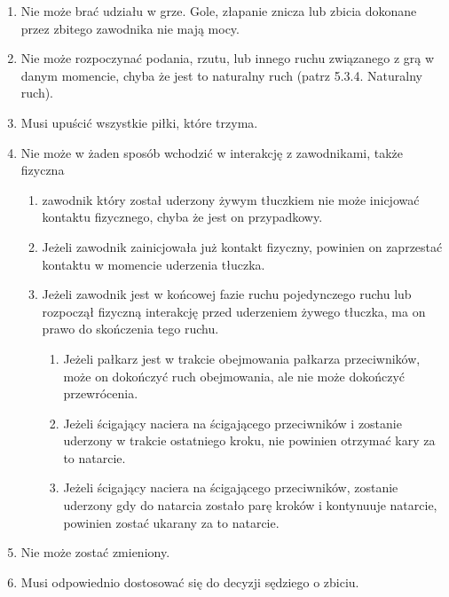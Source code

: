 \documentclass[12pt]{article}
\begin{document}
\begin{enumerate}
	\item
	      Nie może brać udziału w grze. Gole, złapanie znicza lub zbicia
	      dokonane przez zbitego zawodnika nie mają mocy.
	\item
	      Nie może rozpoczynać podania, rzutu, lub innego ruchu związanego z grą
	      w danym momencie, chyba że jest to naturalny ruch (patrz 5.3.4.
	      Naturalny ruch).
	\item
	      Musi upuścić wszystkie piłki, które trzyma.
	\item
	      Nie może w żaden sposób wchodzić w interakcję z zawodnikami, także
	      fizyczna

	      \begin{enumerate}
		      \item
		            zawodnik który został uderzony żywym tłuczkiem nie może inicjować
		            kontaktu fizycznego, chyba że jest on przypadkowy.
		      \item
		            Jeżeli zawodnik zainicjowała już kontakt fizyczny, powinien on
		            zaprzestać kontaktu w momencie uderzenia tłuczka.
		      \item
		            Jeżeli zawodnik jest w końcowej fazie ruchu pojedynczego ruchu lub
		            rozpoczął fizyczną interakcję przed uderzeniem żywego tłuczka, ma on
		            prawo do skończenia tego ruchu.

		            \begin{enumerate}
			            \item
			                  Jeżeli pałkarz jest w trakcie obejmowania pałkarza przeciwników,
			                  może on dokończyć ruch obejmowania, ale nie może dokończyć
			                  przewrócenia.
			            \item
			                  Jeżeli ścigający naciera na ścigającego przeciwników i zostanie
			                  uderzony w trakcie ostatniego kroku, nie powinien otrzymać kary za
			                  to natarcie.
			            \item
			                  Jeżeli ścigający naciera na ścigającego przeciwników, zostanie
			                  uderzony gdy do natarcia zostało parę kroków i kontynuuje
			                  natarcie, powinien zostać ukarany za to natarcie.
		            \end{enumerate}
	      \end{enumerate}
	\item
	      Nie może zostać zmieniony.
	\item
	      Musi odpowiednio dostosować się do decyzji sędziego o zbiciu.
\end{enumerate}
\end{document}
